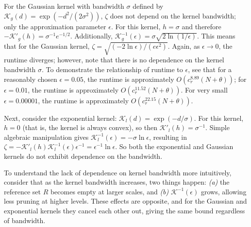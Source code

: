 

For the Gaussian kernel with bandwidth $\sigma$ defined by $\mathcal{K}_g(d) =
\exp(-d^2 / (2 \sigma^2))$, $\zeta$ does not
depend on the kernel bandwidth; only
the approximation parameter $\epsilon$.  For this kernel, $h = \sigma$ and
therefore $-\mathcal{K}'_g(h) = \sigma^{-1} e^{-1 / 2}$.  Additionally,
$\mathcal{K}_g^{-1}(\epsilon) = \sigma \sqrt{2 \ln (1 / \epsilon)}$.  This means
that for the Gaussian kernel, $\zeta = \sqrt{(-2 \ln \epsilon) / (e
\epsilon^2)}$.  Again, as $\epsilon \to 0$, the
runtime diverges; however, note that there is no dependence on the kernel
bandwidth $\sigma$.  To demonstrate the relationship of runtime to $\epsilon$,
see that for a reasonably chosen $\epsilon = 0.05$, the runtime is approximately
$O(c_r^{8.89} (N + \theta))$; for $\epsilon = 0.01$, the runtime is
approximately $O(c_r^{11.52} (N + \theta))$.  For very small $\epsilon =
0.00001$, the runtime is approximately $O(c_r^{22.15} (N + \theta))$.

Next, consider the exponential kernel:
$\mathcal{K}_l(d) = \exp(-d / \sigma)$.  For this kernel, $h = 0$ (that is, the
kernel is always convex), so then $\mathcal{K}'_l(h) = \sigma^{-1}$.  Simple
algebraic manipulation gives $\mathcal{K}^{-1}_l(\epsilon) = -\sigma \ln
\epsilon$, resulting in $\zeta = -\mathcal{K}'_l(h) \mathcal{K}^{-1}_l(\epsilon)
\epsilon^{-1} = \epsilon^{-1} \ln \epsilon$.  So both the exponential and Gaussian
kernels do not exhibit dependence on the bandwidth.

To understand the lack of dependence on kernel bandwidth more intuitively,
consider that as the kernel bandwidth increases, two things happen: {\it (a)}
the reference set $R$ becomes empty at larger scales, and {\it (b)}
$\mathcal{K}^{-1}(\epsilon)$ grows, allowing less pruning at higher levels.
These effects are opposite, and for the Gaussian and exponential kernels they
cancel each other out, giving the same bound regardless of bandwidth.


